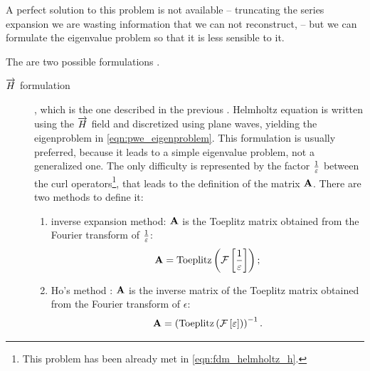 A perfect solution to this problem is not available -- truncating the
series expansion we are wasting information that we can not
reconstruct, -- but we can formulate the eigenvalue problem so that it
is less sensible to it.

The are two possible formulations \cite{villeneuve_photonic}.
\begin{description}
\item[$\overrightarrow{H}$ formulation], which is the one described in the previous
  . Helmholtz equation is written using the $\overrightarrow{H}$ field
  and discretized using plane waves, yielding the eigenproblem in
  \eqref{eqn:pwe_eigenproblem}. This formulation is usually preferred,
  because it leads to a simple eigenvalue problem, not a generalized
  one. The only difficulty is represented by the factor
  $\frac{1}{\varepsilon}$ between the curl operators\footnote{This problem has been
  already met in \eqref{eqn:fdm_helmholtz_h}.}, that leads to the
  definition of the matrix $\mathbf{A}$. There are two
  methods to define it:
  \begin{enumerate}
  \item
    inverse expansion method: $\mathbf{A}$ is the Toeplitz matrix
    \cite{mathworld} obtained from the Fourier transform of
    $\frac{1}{\varepsilon}$:
    \begin{equation*}
      \mathbf{A} = \operatorname{Toeplitz} \left( \mathcal{F}\left[\frac{1}{\varepsilon}\right] \right);
    \end{equation*}
  \item
    Ho's method \cite{ho_existence}: $\mathbf{A}$ is the inverse
    matrix of the Toeplitz matrix obtained from the Fourier transform
    of $\epsilon$:
    \begin{equation*}
      \mathbf{A} = \left(\operatorname{Toeplitz} \left( \mathcal{F}\left[\varepsilon\right] \right) \right)^{-1}.
    \end{equation*}
  \end{enumerate}
  

\end{description}
